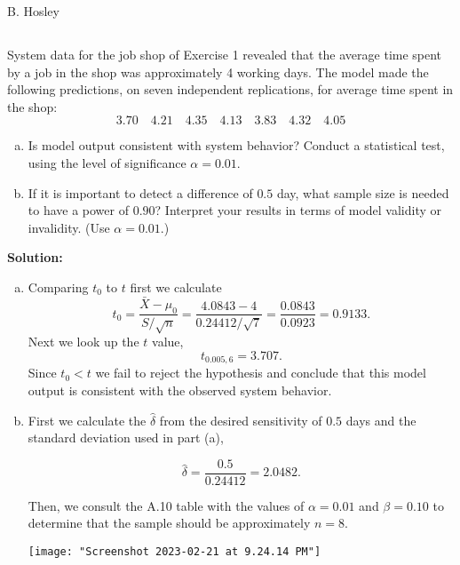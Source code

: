 \documentclass[12pt]{amsart}
\begin{document}
\raggedbottom

\hspace{\fill} {\large B. Hosley}
\bigskip


\setcounter{section}{10}
\setcounter{subsection}{1}
\subsection{}
System data for the job shop of Exercise 1 revealed that the average time spent by a job in the
shop was approximately 4 working days. The model made the following predictions, on seven
independent replications, for average time spent in the shop:
\[3.70\quad 4.21\quad 4.35\quad 4.13\quad 3.83\quad 4.32\quad 4.05\]
\begin{enumerate}[(a)]
	\item Is model output consistent with system behavior? Conduct a statistical test, using the level of
	significance \(\alpha = 0.01\).
	\item If it is important to detect a difference of \(0.5\) day, what sample size is needed to have a power
	of \(0.90\)? Interpret your results in terms of model validity or invalidity. (Use \(\alpha = 0.01\).)
\end{enumerate}

\bigskip
\textbf{Solution:}

\begin{enumerate}[(a)]
	\item 
	Comparing \(t_0\) to \(t\) first we calculate
	\[t_0 = \frac{\bar X - \mu_0}{S/\sqrt n} = \frac{4.0843-4}{0.24412/\sqrt{7}} = \frac{0.0843}{0.0923} = 0.9133.\]
	Next we look up the \(t\) value,
	\[t_{0.005,6} = 3.707.\]
	Since \(t_0 < t\) we fail to reject the hypothesis and 
	conclude that this model output is consistent with the observed system behavior. \\
	
	\item 
	First we calculate the \(\hat\delta\) from the desired sensitivity of \(0.5\) 
	days and the standard deviation used in part (a),
	
	\[\hat\delta = \frac{0.5}{0.24412} = 2.0482.\] 
	
	Then, we consult the A.10 table with the values of \(\alpha=0.01\) and \(\beta=0.10\) 
	to determine that the sample should be approximately \(n=8\).
	\begin{center}
		\texttt{[image: "Screenshot 2023-02-21 at 9.24.14 PM"]}
	\end{center}
	
\end{enumerate}
	
	
\end{document}
